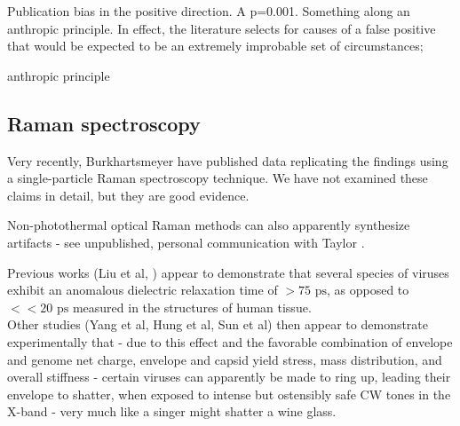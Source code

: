 \documentclass[paper.tex]{subfiles}
\begin{document}

Publication bias in the positive direction. A p=0.001. Something along an anthropic principle. In effect, the literature selects for causes of a false positive that would be expected to be an extremely improbable set of circumstances; 

anthropic principle


\subsection{Raman spectroscopy}

Very recently, Burkhartsmeyer \cite{Optical2020} have published data replicating the findings using a single-particle Raman spectroscopy technique. We have not examined these claims in detail, but they are good evidence.

Non-photothermal optical Raman methods can also apparently synthesize artifacts - see unpublished, personal communication with Taylor \cite{mechanisms1981}. 



























Previous works (Liu et al, ) appear to demonstrate that several species of viruses exhibit an anomalous dielectric relaxation time of $> 75 \text{ ps}$, as opposed to $<< 20 \text{ ps}$ \footnotemark measured in the structures of human tissue.\\

Other studies (Yang et al, Hung et al, Sun et al) then appear to demonstrate experimentally that - due to this effect and the favorable combination of envelope and genome net charge, envelope and capsid yield stress, mass distribution, and overall stiffness - certain viruses can  apparently be made to ring up, leading their envelope to shatter, when exposed to intense but ostensibly safe CW tones in the X-band - very much like a singer might shatter a wine glass.\\
\end{document}
